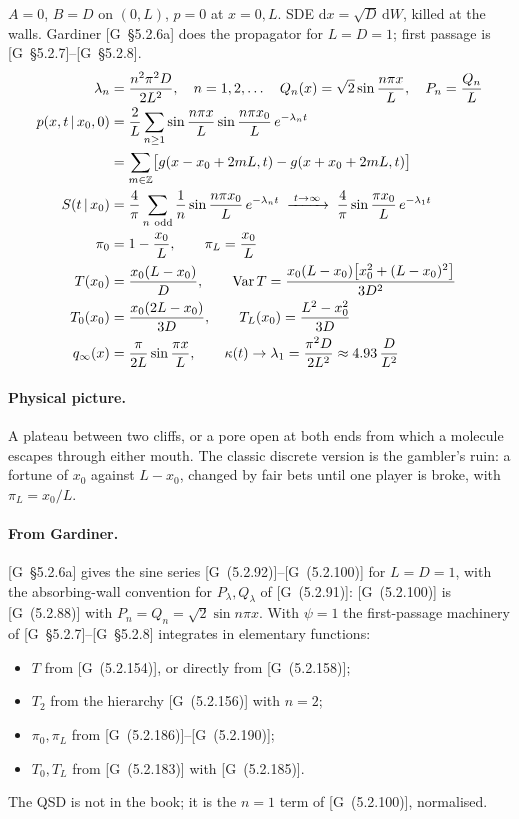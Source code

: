 \documentclass[11pt]{article}
\numberwithin{equation}{section}
\newcommand{\dd}{\mathrm{d}}
\newcommand{\given}{\,|\,}
\newcommand{\nodd}{\sum_{n\ \mathrm{odd}}}
\newcommand{\G}[1]{[G~(#1)]}
\newcommand{\Gs}[1]{[G~\S#1]}
\begin{document}
\begin{keyresults}
$A=0$, $B=D$ on $(0,L)$, $p=0$ at $x=0,L$. SDE $\dd x=\sqrt D\,\dd W$, killed at the walls.
Gardiner \Gs{5.2.6a} does the propagator for $L=D=1$; first passage is \Gs{5.2.7}--\Gs{5.2.8}.
\begin{align}
  \lambda_n &= \frac{n^2\pi^2D}{2L^2},\quad n=1,2,\dots \quad Q_n(x)=\sqrt2\sin\frac{n\pi x}{L},\quad P_n=\frac{Q_n}L \\
  p(x,t\given x_0,0) &= \frac2L\sum_{n\ge1}\sin\frac{n\pi x}{L}\sin\frac{n\pi x_0}{L}\,e^{-\lambda_nt} \notag\\
  &= \sum_{m\in\mathbb Z}\bigl[g(x-x_0+2mL,t)-g(x+x_0+2mL,t)\bigr] \label{eq:A-prop}\\
  S(t\given x_0) &= \frac4\pi\nodd\frac1n\sin\frac{n\pi x_0}{L}\,e^{-\lambda_nt}
  \;\xrightarrow{\;t\to\infty\;}\; \frac4\pi\sin\frac{\pi x_0}{L}\,e^{-\lambda_1t} \label{eq:A-surv}\\
  \pi_0 &= 1-\frac{x_0}{L},\qquad \pi_L=\frac{x_0}{L} \\
  T(x_0) &= \frac{x_0(L-x_0)}{D},\qquad
  \operatorname{Var}T = \frac{x_0(L-x_0)\bigl[x_0^2+(L-x_0)^2\bigr]}{3D^2} \\
  T_0(x_0) &= \frac{x_0(2L-x_0)}{3D},\qquad T_L(x_0)=\frac{L^2-x_0^2}{3D} \\
  q_\infty(x) &= \frac{\pi}{2L}\sin\frac{\pi x}{L},\qquad \kappa(t)\to\lambda_1=\frac{\pi^2D}{2L^2}\approx4.93\,\frac{D}{L^2}
\end{align}
\end{keyresults}

\paragraph{Physical picture.} A plateau between two cliffs, or a pore open at both ends from which a molecule
escapes through either mouth. The classic discrete version is the gambler's ruin: a fortune of $x_0$ against
$L-x_0$, changed by fair bets until one player is broke, with $\pi_L=x_0/L$.

\paragraph{From Gardiner.} \Gs{5.2.6a} gives the sine series \G{5.2.92}--\G{5.2.100} for $L=D=1$, with the
absorbing-wall convention for $P_\lambda,Q_\lambda$ of \G{5.2.91}: \G{5.2.100} is \G{5.2.88} with
$P_n=Q_n=\sqrt2\sin n\pi x$. With $\psi=1$ the first-passage machinery
of \Gs{5.2.7}--\Gs{5.2.8} integrates in elementary functions:
\begin{itemize}
  \item $T$ from \G{5.2.154}, or directly from \G{5.2.158};
  \item $T_2$ from the hierarchy \G{5.2.156} with $n=2$;
  \item $\pi_0,\pi_L$ from \G{5.2.186}--\G{5.2.190};
  \item $T_0,T_L$ from \G{5.2.183} with \G{5.2.185}.
\end{itemize}
The QSD is not in the book; it is the $n=1$ term of \G{5.2.100}, normalised.
\end{document}
